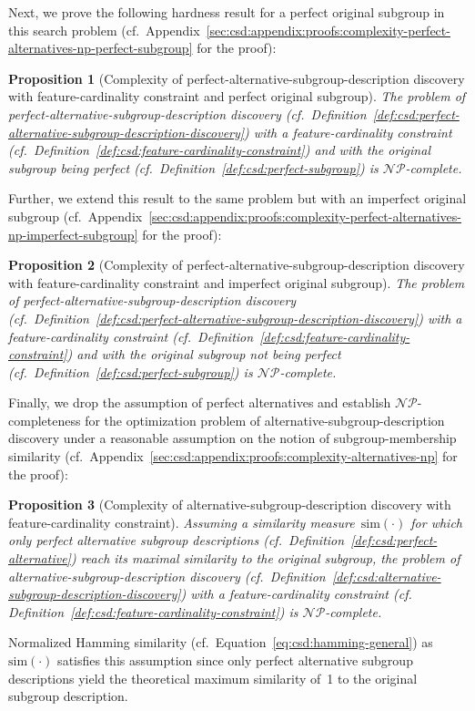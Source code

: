 \documentclass{article}
\newtheorem{proposition}{Proposition}
\theoremstyle{definition}
\begin{document}
%
Next, we prove the following hardness result for a perfect original subgroup in this search problem (cf.~Appendix~\ref{sec:csd:appendix:proofs:complexity-perfect-alternatives-np-perfect-subgroup} for the proof):
%
\begin{proposition}[Complexity of perfect-alternative-subgroup-description discovery with feature-cardinality constraint and perfect original subgroup]
	The problem of perfect-alternative-subgroup-description discovery (cf.~Definition~\ref{def:csd:perfect-alternative-subgroup-description-discovery}) with a feature-cardinality constraint (cf.~Definition~\ref{def:csd:feature-cardinality-constraint}) and with the original subgroup being perfect (cf.~Definition~\ref{def:csd:perfect-subgroup}) is $\mathcal{NP}$-complete.
	\label{prop:csd:complexity-perfect-alternatives-np-perfect-subgroup}
\end{proposition}
%
Further, we extend this result to the same problem but with an imperfect original subgroup (cf.~Appendix~\ref{sec:csd:appendix:proofs:complexity-perfect-alternatives-np-imperfect-subgroup} for the proof):
%
\begin{proposition}[Complexity of perfect-alternative-subgroup-description discovery with feature-cardinality constraint and imperfect original subgroup]
	The problem of perfect-alternative-subgroup-description discovery (cf.~Definition~\ref{def:csd:perfect-alternative-subgroup-description-discovery}) with a feature-cardinality constraint (cf.~Definition~\ref{def:csd:feature-cardinality-constraint}) and with the original subgroup \emph{not} being perfect (cf.~Definition~\ref{def:csd:perfect-subgroup}) is $\mathcal{NP}$-complete.
	\label{prop:csd:complexity-perfect-alternatives-np-imperfect-subgroup}
\end{proposition}
%
Finally, we drop the assumption of perfect alternatives and establish $\mathcal{NP}$-completeness for the optimization problem of alternative-subgroup-description discovery under a reasonable assumption on the notion of subgroup-membership similarity (cf.~Appendix~\ref{sec:csd:appendix:proofs:complexity-alternatives-np} for the proof):
%
\begin{proposition}[Complexity of alternative-subgroup-description discovery with feature-cardinality constraint]
	Assuming a similarity measure~$\text{sim}(\cdot)$ for which only perfect alternative subgroup descriptions (cf.~Definition~\ref{def:csd:perfect-alternative}) reach its maximal similarity to the original subgroup,
	the problem of alternative-subgroup-description discovery (cf.~Definition~\ref{def:csd:alternative-subgroup-description-discovery}) with a feature-cardinality constraint (cf. Definition~\ref{def:csd:feature-cardinality-constraint}) is $\mathcal{NP}$-complete.
	\label{prop:csd:complexity-alternatives-np}
\end{proposition}
%
Normalized Hamming similarity (cf.~Equation~\ref{eq:csd:hamming-general}) as~$\text{sim}(\cdot)$ satisfies this assumption since only perfect alternative subgroup descriptions yield the theoretical maximum similarity of~1 to the original subgroup description.
\end{document}
